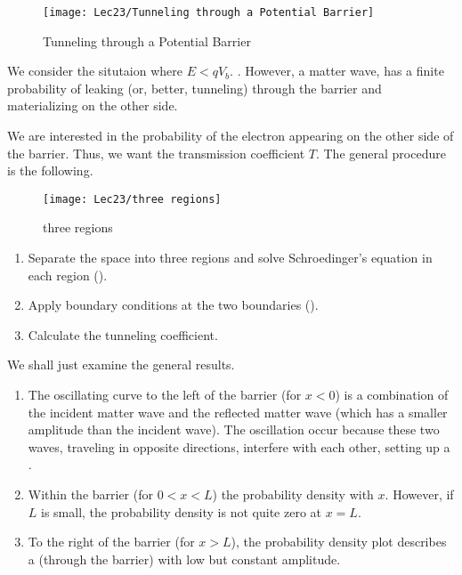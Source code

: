 \begin{figure}[H]
    \centering
    \texttt{[image: Lec23/Tunneling through a Potential Barrier]}
    \caption{Tunneling through a Potential Barrier}
\end{figure}

We consider the situtaion where $E<qV_b$. . However, a matter wave, has a finite probability of leaking (or, better, tunneling) through the barrier and materializing on the other side. 

We are interested in the probability of the electron appearing on the other side of the barrier. Thus, we want the transmission coefficient $T$. The general procedure is the following. 

\begin{figure}[H]
    \centering
    \texttt{[image: Lec23/three regions]}
    \caption{three regions}
\end{figure}

\begin{enumerate}
    \item Separate the space into three regions and solve Schroedinger's equation in each region ().
    \item Apply boundary conditions at the two boundaries ().
    \item Calculate the tunneling coefficient.
\end{enumerate}

We shall just examine the general results. 

\begin{enumerate}
    \item The oscillating curve to the left of the barrier (for $x<0$) is a combination of the incident matter wave and the reflected matter wave (which has a smaller amplitude than the incident wave). The oscillation occur because these two waves, traveling in opposite directions, interfere with each other, setting up a . 
    \item Within the barrier (for $0<x<L$) the probability density  with $x$. However, if $L$ is small, the probability density is not quite zero at $x=L$. 
    \item To the right of the barrier (for $x>L$), the probability density plot describes a  (through the barrier) with low but constant amplitude. 
\end{enumerate}

